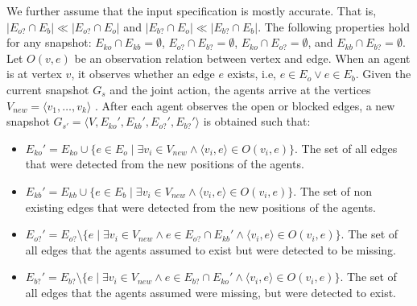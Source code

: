 \documentclass[letterpaper]{article} %
\def\
UrlFont{\rm}  %
\newcommand{\eo}{E_{o}} %
\newcommand{\eb}{E_{b}} %
\newcommand{\eko}{E_{ko}} %
\newcommand{\ekb}{E_{kb}} %
\newcommand{\eao}{E_{o?}} %
\newcommand{\eab}{E_{b?}} %
\theoremstyle{definition}
\begin{document}
We further assume that the input specification is mostly accurate. That is, $| \eao \cap E_b | \ll |\eao \cap E_o|$ and $| \eab \cap E_o | \ll |\eab \cap E_b|$.
The following properties hold for any snapshot:
$\eko \cap \ekb = \emptyset$, $\eao \cap \eab = \emptyset$, $\eko \cap \eao = \emptyset$, and $\ekb \cap \eab = \emptyset$.
Let $O(v, e)$ be an observation relation between vertex and edge. When an agent is at vertex $v$, it observes whether an edge $e$ exists, i.e, $e \in \eo \lor e \in \eb$. Given the current snapshot $G_s$ and the joint action, the agents arrive at the vertices $V_{new}= \langle v_1, \dots, v_k \rangle$ . After each agent observes the open or blocked edges, a new snapshot $G_{s'} = \langle V, \eko', \ekb', \eao', \eab' \rangle $ is obtained such that:
\begin{itemize}
    \item $\eko' = \eko \cup \{e \in \eo \mid \exists v_i \in V_{new} \land \langle v_i, e \rangle \in O(v_i, e)\}$. The set of all edges that were detected from the new positions of the agents.
    \item $\ekb' = \ekb \cup \{e \in \eb \mid \exists v_i \in V_{new} \land \langle v_i, e \rangle \in O(v_i, e)\}$. The set of non existing edges that were detected from the new positions of the agents.
    \item $\eao' = \eao \setminus \{e \mid \exists v_i \in V_{new} \land e \in \eao \cap \ekb' \land \langle v_i, e \rangle \in O(v_i,e)\}$. The set of all edges that the agents assumed to exist but were detected to be missing.
    \item $\eab' = \eab \setminus \{e \mid \exists v_i \in V_{new} \land e \in \eab \cap \eko' \land \langle v_i, e \rangle \in O(v_i,e)\}$. The set of all edges that the agents assumed were missing, but were detected to exist.
\end{itemize}
\end{document}
